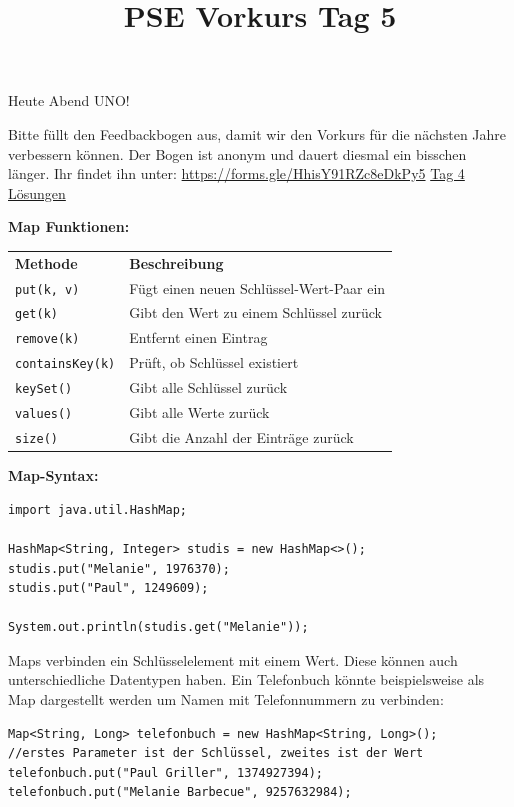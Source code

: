 \documentclass{../../sheet}
\title{PSE Vorkurs Tag 5}
\begin{document}
\maketitle
Heute Abend UNO!


Bitte füllt den Feedbackbogen aus, damit wir den Vorkurs für die nächsten Jahre verbessern können. Der Bogen ist anonym und dauert diesmal ein bisschen länger. \newline Ihr findet ihn unter: \url{https://forms.gle/HhisY91RZc8eDkPy5}
\href{https://fius.de/wp-content/uploads/2025/10/Day4Musterloesung.zip}{Tag 4 Lösungen}

\textbf{Map Funktionen:}
\begin{table}[h]
    \centering
    \begin{tabular}{l l}
        \rowcolor{tablehead}
        \textbf{Methode}        & \textbf{Beschreibung}                    \\
        \texttt{put(k, v)}      & Fügt einen neuen Schlüssel-Wert-Paar ein \\
        \texttt{get(k)}         & Gibt den Wert zu einem Schlüssel zurück  \\
        \texttt{remove(k)}      & Entfernt einen Eintrag                   \\
        \texttt{containsKey(k)} & Prüft, ob Schlüssel existiert            \\
        \texttt{keySet()}       & Gibt alle Schlüssel zurück               \\
        \texttt{values()}       & Gibt alle Werte zurück                   \\
        \texttt{size()}         & Gibt die Anzahl der Einträge zurück      \\
    \end{tabular}
\end{table}

\textbf{Map-Syntax:}

\begin{verbatim}
import java.util.HashMap;

HashMap<String, Integer> studis = new HashMap<>();
studis.put("Melanie", 1976370);
studis.put("Paul", 1249609);

System.out.println(studis.get("Melanie"));
	\end{verbatim}


\newpage
{}
Maps verbinden ein Schlüsselelement mit einem Wert. Diese können auch unterschiedliche Datentypen haben. Ein Telefonbuch könnte beispielsweise als Map dargestellt werden um Namen mit Telefonnummern zu verbinden:
\begin{verbatim}
Map<String, Long> telefonbuch = new HashMap<String, Long>();
//erstes Parameter ist der Schlüssel, zweites ist der Wert
telefonbuch.put("Paul Griller", 1374927394);
telefonbuch.put("Melanie Barbecue", 9257632984);
\end{verbatim}
\end{document}
